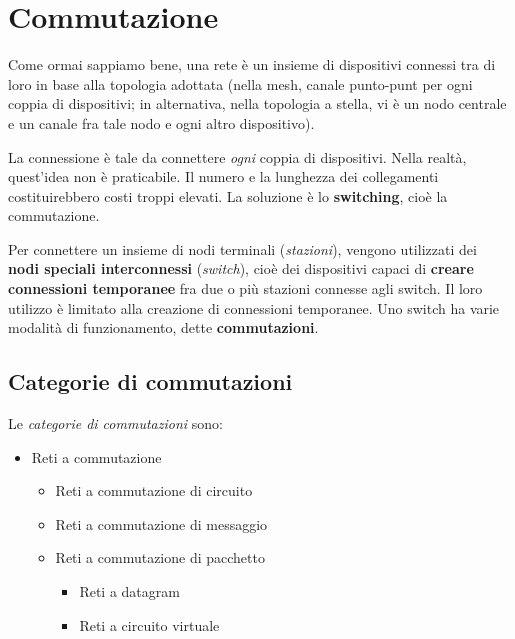 \section{Commutazione}
    Come ormai sappiamo bene, una rete è un insieme di dispositivi connessi tra di loro in base alla topologia adottata (nella mesh, canale punto-punt per ogni coppia di dispositivi; in alternativa, nella topologia a stella, vi è un nodo centrale e un canale fra tale nodo e ogni altro dispositivo). 
    
    La connessione è tale da connettere \textit{ogni} coppia di dispositivi. Nella realtà, quest'idea non è praticabile. Il numero e la lunghezza dei collegamenti costituirebbero costi troppi elevati. La soluzione è lo \textbf{switching}, cioè la commutazione.
    
    \vspace{3mm}
    
    Per connettere un insieme di nodi terminali (\textit{stazioni}), vengono utilizzati dei \textbf{nodi speciali interconnessi} (\textit{switch}), cioè dei dispositivi capaci di \textbf{creare connessioni temporanee} fra due o più stazioni connesse agli switch. Il loro utilizzo è limitato alla creazione di connessioni temporanee. Uno switch ha varie modalità di funzionamento, dette \textbf{commutazioni}.
    
    \subsection{Categorie di commutazioni}
    
        Le \textit{categorie di commutazioni} sono:
        
        \begin{itemize}
            \item 
                Reti a commutazione
            
            \begin{itemize}
                \item 
                    Reti a commutazione di circuito
                    
                \item 
                    Reti a commutazione di messaggio
    
                \item 
                    Reti a commutazione di pacchetto
                
                    \begin{itemize}
                        \item 
                            Reti a datagram
                            
                        \item 
                            Reti a circuito virtuale
                    \end{itemize}
            \end{itemize}
        \end{itemize}
    
